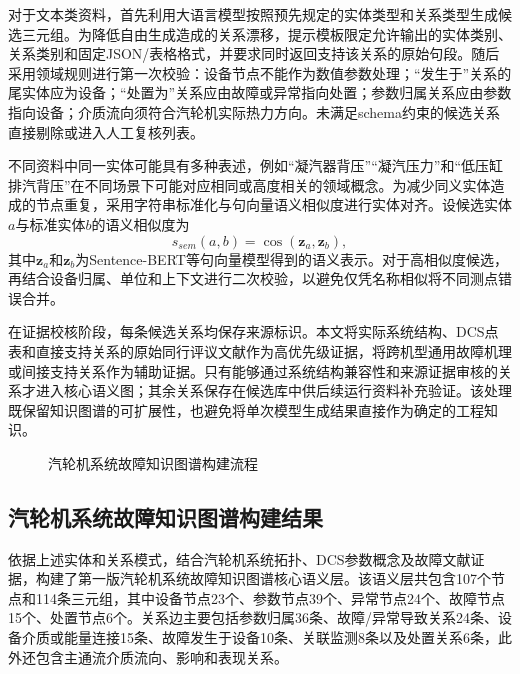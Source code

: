 对于文本类资料，首先利用大语言模型按照预先规定的实体类型和关系类型生成候选三元组。为降低自由生成造成的关系漂移，提示模板限定允许输出的实体类别、关系类别和固定JSON/表格格式，并要求同时返回支持该关系的原始句段。随后采用领域规则进行第一次校验：设备节点不能作为数值参数处理；“发生于”关系的尾实体应为设备；“处置为”关系应由故障或异常指向处置；参数归属关系应由参数指向设备；介质流向须符合汽轮机实际热力方向。未满足schema约束的候选关系直接剔除或进入人工复核列表。

不同资料中同一实体可能具有多种表述，例如“凝汽器背压”“凝汽压力”和“低压缸排汽背压”在不同场景下可能对应相同或高度相关的领域概念。为减少同义实体造成的节点重复，采用字符串标准化与句向量语义相似度进行实体对齐。设候选实体$a$与标准实体$b$的语义相似度为
\begin{equation}
    s_{sem}(a,b)=\cos(\mathbf z_a,\mathbf z_b),
\end{equation}
其中$\mathbf z_a$和$\mathbf z_b$为Sentence-BERT等句向量模型得到的语义表示\cite{Reimers2019SentenceBERT}。对于高相似度候选，再结合设备归属、单位和上下文进行二次校验，以避免仅凭名称相似将不同测点错误合并。

在证据校核阶段，每条候选关系均保存来源标识。本文将实际系统结构、DCS点表和直接支持关系的原始同行评议文献作为高优先级证据，将跨机型通用故障机理或间接支持关系作为辅助证据。只有能够通过系统结构兼容性和来源证据审核的关系才进入核心语义图；其余关系保存在候选库中供后续运行资料补充验证。该处理既保留知识图谱的可扩展性，也避免将单次模型生成结果直接作为确定的工程知识。

\begin{figure}[htbp]
    \centering
    \caption{汽轮机系统故障知识图谱构建流程}
    \label{fig:kg_construction_flow_v3}
\end{figure}

\subsection{汽轮机系统故障知识图谱构建结果}
\label{subsec:kg_results_v3}

依据上述实体和关系模式，结合汽轮机系统拓扑、DCS参数概念及故障文献证据，构建了第一版汽轮机系统故障知识图谱核心语义层。该语义层共包含107个节点和114条三元组，其中设备节点23个、参数节点39个、异常节点24个、故障节点15个、处置节点6个。关系边主要包括参数归属36条、故障/异常导致关系24条、设备介质或能量连接15条、故障发生于设备10条、关联监测8条以及处置关系6条，此外还包含主通流介质流向、影响和表现关系。

